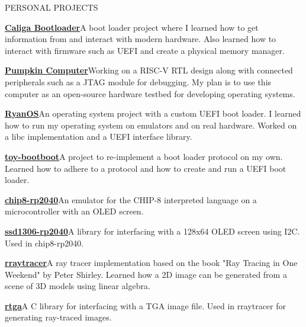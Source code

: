 \documentclass{resume} %
\begin{document}

\begin{rSection}{PERSONAL PROJECTS}
	\itemsep -8pt{}
	\item \href{https://github.com/raccog/caliga-bootloader}{\textbf{Caliga Bootloader}}\quad A boot loader project where I learned how to get information from and interact with modern hardware. Also learned how to interact with firmware such as UEFI and create a physical memory manager.
	\item \href{https://github.com/raccog/PumpkinComputer}{\textbf{Pumpkin Computer}}\quad Working on a RISC-V RTL design along with connected peripherals such as a JTAG module for debugging. My plan is to use this computer as an open-source hardware testbed for developing operating systems.
	\item \href{https://github.com/raccog/RyanOS}{\textbf{RyanOS}}\quad An operating system project with a custom UEFI boot loader. I learned how to run my operating system on emulators and on real hardware. Worked on a libc implementation and a UEFI interface library.
	\item \href{https://github.com/raccog/toy-bootboot}{\textbf{toy-bootboot}}\quad A project to re-implement a boot loader protocol on my own. Learned how to adhere to a protocol and how to create and run a UEFI boot loader.
	\item \href{https://github.com/raccog/chip8-rp2040}{\textbf{chip8-rp2040}}\quad An emulator for the CHIP-8 interpreted language on a microcontroller with an OLED screen.
	\item \href{https://github.com/raccog/ssd1306-rp2040}{\textbf{ssd1306-rp2040}}\quad A library for interfacing with a 128x64 OLED screen using I2C. Used in chip8-rp2040.
	\item \href{https://github.com/raccog/rraytracer}{\textbf{rraytracer}}\quad A ray tracer implementation based on the book "Ray Tracing in One Weekend" by Peter Shirley. Learned how a 2D image can be generated from a scene of 3D models using linear algebra.
	\item \href{https://github.com/raccog/rtga}{\textbf{rtga}}\quad A C library for interfacing with a TGA image file. Used in rraytracer for generating ray-traced images.
\end{rSection}
\end{document}

